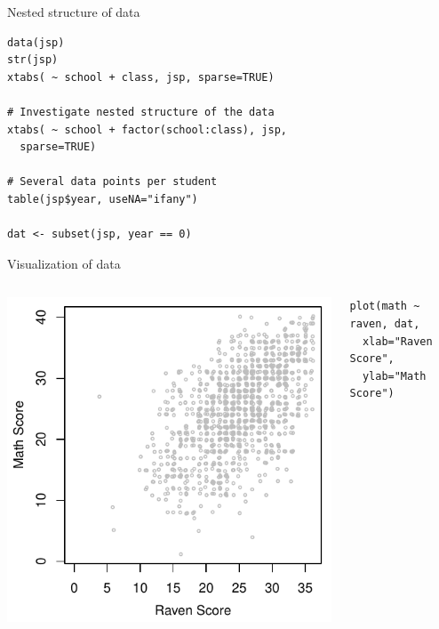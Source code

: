 \documentclass{beamer}
\begin{document}
{

\begin{frame}[fragile]{Nested structure of data}
  \begin{lstlisting}
data(jsp)
str(jsp)
xtabs( ~ school + class, jsp, sparse=TRUE)

# Investigate nested structure of the data
xtabs( ~ school + factor(school:class), jsp,
  sparse=TRUE)

# Several data points per student
table(jsp$year, useNA="ifany")

dat <- subset(jsp, year == 0)
  \end{lstlisting}
\end{frame}

}

\begin{frame}[fragile]{Visualization of data}
  \begin{columns}
    \begin{column}{6cm}
      \includegraphics[scale=.8]{../figures/jsp_scatter}
    \end{column}
    \begin{column}{4cm}
      \begin{lstlisting}[style=plain]
plot(math ~ raven, dat,
  xlab="Raven Score", 
  ylab="Math Score")
      \end{lstlisting}
    \end{column}
  \end{columns}
\end{frame}
\end{document}
